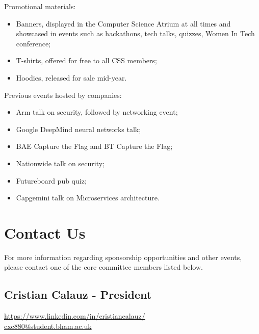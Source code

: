\documentclass{article}
\begin{document}
\setlength{\columnsep}{1cm}
\begin{multicols}{2}

\noindent Promotional materials:
\medskip
\begin{itemize}
  \item Banners, displayed in the Computer Science Atrium at all times and showcased in events such as hackathons, tech talks, quizzes, Women In Tech conference;
  \item T-shirts, offered for free to all CSS members;
  \item Hoodies, released for sale mid-year. 
\end{itemize}

\vfill\null
\columnbreak

\noindent Previous events hosted by companies:
\medskip
\begin{itemize}
  \item Arm talk on security, followed by networking event;
  \item Google DeepMind neural networks talk;
  \item BAE Capture the Flag and BT Capture the Flag;
  \item Nationwide talk on security;
  \item Futureboard pub quiz;
  \item Capgemini talk on Microservices architecture.
\end{itemize}

\end{multicols}

\fontsize{13}{14}\selectfont

\section*{Contact Us}

For more information regarding sponsorship opportunities and other events, 
please contact one of the core committee members listed below.

\subsection*{Cristian Calauz - President}

\faLinkedin \hspace{0.1cm} \url{https://www.linkedin.com/in/cristiancalauz/} \\
\faEnvelope \hspace{0.1cm} \href{mailto:cxc880@student.bham.ac.uk}{cxc880@student.bham.ac.uk}
\end{document}
